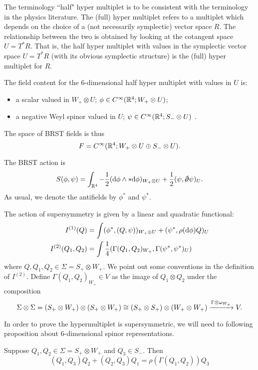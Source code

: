 \documentclass[10pt, oneside]{article}
\begin{document}
\begin{remark}
The terminology ``half" hyper multiplet is to be consistent with the terminology in the physics literature. 
The (full) hyper multiplet refers to a multiplet which depends on the choice of a (not necessarily symplectic) vector space $R$. 
The relationship between the two is obtained by looking at the cotangent space $U = T^*R$.
That is, the half hyper multiplet with values in the symplectic vector space $U = T^* R$ (with its obvious symplectic structure) is the (full) hyper multiplet for $R$. 
\end{remark}

The field content for the 6-dimensional half hyper multiplet with values in $U$ is:
\begin{itemize}
\item a scalar valued in $W_+ \otimes U$; $\phi \in C^\infty(\mathbb R^4 ; W_+ \otimes U)$;
\item a negative Weyl spinor valued in $U$; $\psi \in C^\infty(\mathbb R^4 ; S_- \otimes U)$ .
\end{itemize}

The space of BRST fields is thus
\[
F = C^\infty(\mathbb R^4 ; W_+ \otimes U \oplus S_- \otimes U) .
\]

The BRST action is
\[
S (\phi, \psi) = \int_{\RR^4} - \frac{1}{2}  (\d \phi \wedge * \d \phi)_{W_+ \otimes U} + \frac{1}{2} (\psi , \sd \dd \psi)_U .
\]
As usual, we denote the antifields by $\phi^*$ and $\psi^*$. 

The action of supersymmetry is given by a linear and quadratic functional:
\begin{align*}
I^{(1)} (Q) & = \int (\phi^*, (Q, \psi))_{W_+ \otimes U} + (\psi^*, \rho({\rm d} \phi) Q)_U \\
I^{(2)} (Q_1 , Q_2) & =  \int \frac{1}{4}(\Gamma(Q_1, Q_2)_{W_+} , \Gamma(\psi^*, \psi^*)_{U}) 
\end{align*}
where $Q, Q_1,Q_2 \in \Sigma = S_+ \otimes W_+$. 
We point out some conventions in the definition of $I^{(2)}$. 
Define $\Gamma (Q_1,Q_2)_{W_+} \in V$ as the image of $Q_1 \otimes Q_2$ under the composition
\[
\Sigma \otimes \Sigma = (S_+ \otimes W_+) \otimes (S_+ \otimes W_+) \cong (S_+ \otimes S_+) \otimes (W_+ \otimes W_+) \xrightarrow{\Gamma \otimes \omega_{W_+}} V .
\]

In order to prove the hypermultiplet is supersymmetric, we will need to following proposition about $6$-dimensional spinor representations. 

\begin{prop}\label{prop: new3psi}
Suppose $Q_1,Q_2 \in \Sigma = S_+ \otimes W_+$ and $Q_3 \in S_-$. 
Then
\[
(Q_1, Q_3) Q_2 + (Q_2, Q_3)Q_1 = \rho(\Gamma(Q_1,Q_2)) Q_3
\]
\end{prop}
\end{document}
